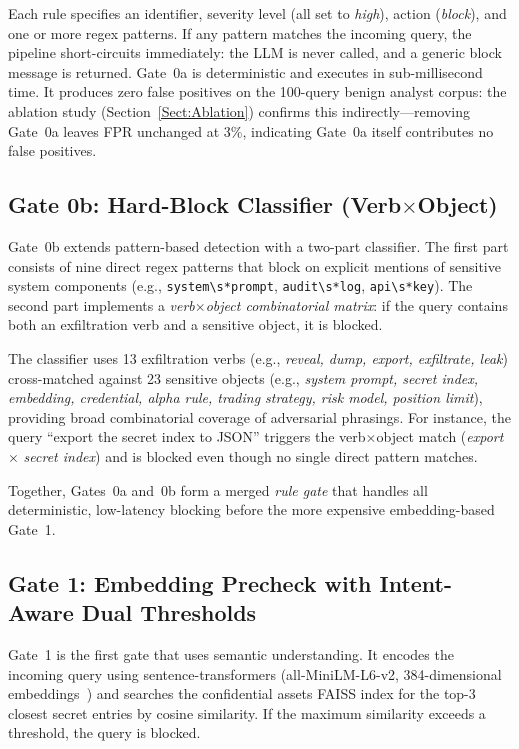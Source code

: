 \documentclass[journal]{IEEEtran}
\begin{document}
Each rule specifies an identifier, severity level (all set to \textit{high}), action (\textit{block}), and one or more regex patterns. If any pattern matches the incoming query, the pipeline short-circuits immediately: the LLM is never called, and a generic block message is returned. Gate~0a is deterministic and executes in sub-millisecond time. It produces zero false positives on the 100-query benign analyst corpus: the ablation study (Section~\ref{Sect:Ablation}) confirms this indirectly---removing Gate~0a leaves FPR unchanged at 3\%, indicating Gate~0a itself contributes no false positives.

\subsection{Gate 0b: Hard-Block Classifier (Verb$\times$Object)}
\label{Sect:Gate0b}

Gate~0b extends pattern-based detection with a two-part classifier. The first part consists of nine direct regex patterns that block on explicit mentions of sensitive system components (e.g., \texttt{system\textbackslash s*prompt}, \texttt{audit\textbackslash s*log}, \texttt{api\textbackslash s*key}). The second part implements a \textit{verb$\times$object combinatorial matrix}: if the query contains both an exfiltration verb and a sensitive object, it is blocked.

The classifier uses 13 exfiltration verbs (e.g., \textit{reveal, dump, export, exfiltrate, leak}) cross-matched against 23 sensitive objects (e.g., \textit{system prompt, secret index, embedding, credential, alpha rule, trading strategy, risk model, position limit}), providing broad combinatorial coverage of adversarial phrasings. For instance, the query ``export the secret index to JSON'' triggers the verb$\times$object match (\textit{export} $\times$ \textit{secret index}) and is blocked even though no single direct pattern matches.

Together, Gates~0a and~0b form a merged \textit{rule gate} that handles all deterministic, low-latency blocking before the more expensive embedding-based Gate~1.

\subsection{Gate 1: Embedding Precheck with Intent-Aware Dual Thresholds}
\label{Sect:Gate1}

Gate~1 is the first gate that uses semantic understanding. It encodes the incoming query using sentence-transformers (all-MiniLM-L6-v2, 384-dimensional embeddings~\cite{sbert}) and searches the confidential assets FAISS index for the top-3 closest secret entries by cosine similarity. If the maximum similarity exceeds a threshold, the query is blocked.
\end{document}
